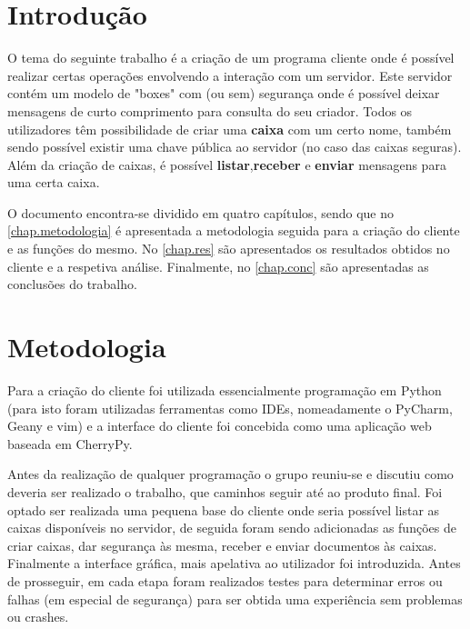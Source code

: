 \documentclass{report}
\begin{document}
\tableofcontents


%
\clearpage
{} %
%
\chapter{Introdução}
\label{chap.introducao} 

O tema do seguinte trabalho é a criação de um programa cliente onde é possível realizar certas operações envolvendo a interação com um servidor.
Este servidor contém um modelo de "boxes" com (ou sem) segurança onde é possível deixar mensagens de curto comprimento para consulta do seu criador. Todos os utilizadores têm possibilidade de criar uma \textbf{caixa} com um certo nome, também sendo possível existir uma chave pública ao servidor (no caso das caixas seguras). Além da criação de caixas, é possível \textbf{listar},\textbf{receber} e \textbf{enviar} mensagens para uma certa caixa.

O documento encontra-se dividido em quatro capítulos,
sendo que no \autoref{chap.metodologia} é apresentada a metodologia seguida para a criação do cliente e
as funções do mesmo.
No \autoref{chap.res} são apresentados os resultados obtidos no cliente e a respetiva análise.
Finalmente, no \autoref{chap.conc} são apresentadas
as conclusões do trabalho.

\chapter{Metodologia}
\label{chap.metodologia}

Para a criação do cliente foi utilizada essencialmente programação em Python (para isto foram utilizadas ferramentas como IDEs, nomeadamente o PyCharm, Geany e vim) e a interface do cliente foi concebida como uma aplicação web baseada em CherryPy.

Antes da realização de qualquer programação o grupo reuniu-se e discutiu como deveria ser realizado o trabalho, que caminhos seguir até ao produto final. Foi optado ser realizada uma pequena base do cliente onde seria possível listar as caixas disponíveis no servidor, de seguida foram sendo adicionadas as funções de criar caixas, dar segurança às mesma, receber e enviar documentos às caixas. Finalmente a interface gráfica, mais apelativa ao utilizador foi introduzida. Antes de prosseguir, em cada etapa foram realizados testes para determinar erros ou falhas (em especial de segurança) para ser obtida uma experiência sem problemas ou crashes. 
\end{document}
